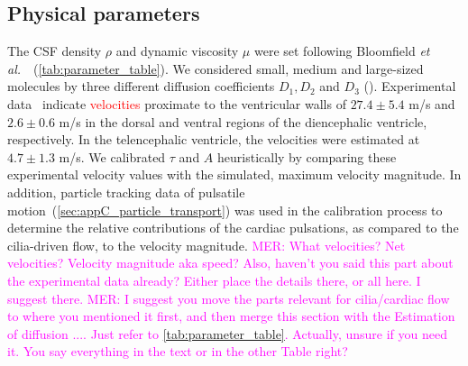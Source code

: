 \documentclass[fleqn]{wlscirep}
\newcommand{\mer}[1]{\textcolor{magenta}{#1}}
\newcommand{\fixme}[1]{\textcolor{red}{#1}}
\begin{document}
\subsection*{Physical parameters}
The CSF density $\rho$ and dynamic viscosity $\mu$ were set following Bloomfield \textit{et al.}~\cite{Bloomfield1998EffectsFluid}~(\cref{tab:parameter_table}). We considered small, medium and large-sized molecules by three different diffusion coefficients $D_1, D_2$ and $D_3$ (). Experimental data~\cite{Olstad2019CiliaryDevelopment} indicate \fixme{velocities} proximate to the ventricular walls of $27.4 \pm 5.4$ \textmu m/s and $2.6 \pm 0.6$ \textmu m/s in the dorsal and ventral regions of the diencephalic ventricle, respectively. In the telencephalic ventricle, the velocities were estimated at $4.7 \pm 1.3$ \textmu m/s. We calibrated $\tau$ and $A$ heuristically by comparing these experimental velocity values with the simulated, maximum velocity magnitude. In addition, particle tracking data of pulsatile motion~(\cref{sec:appC_particle_transport}) was used in the calibration process to determine the relative contributions of the cardiac pulsations, as compared to the cilia-driven flow, to the velocity magnitude.
\mer{MER: What velocities? Net velocities? Velocity magnitude aka speed? Also, haven't you said this part about the experimental data already? Either place the details there, or all here. I suggest there.}
\mer{MER: I suggest you move the parts relevant for cilia/cardiac flow to where you mentioned it first, and then merge this section with the Estimation of diffusion .... Just refer to \cref{tab:parameter_table}. Actually, unsure if you need it. You say everything in the text or in the other Table right?}
\end{document}
